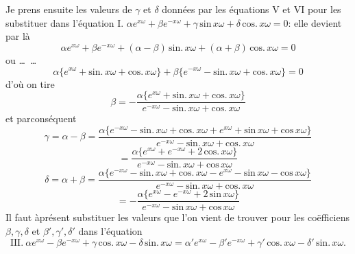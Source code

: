 \documentclass[11pt,a4paper]{article}
\begin{document}
Je prens ensuite les valeurs de $\gamma$ et $\delta$ données par les équations V et VI pour les
substituer dans l'équation I. $\alpha e^{x\omega} + \beta e^{-x\omega} + \gamma\,\text{sin}\,x\omega + \delta\,\text{cos.}\,x\omega = 0$: elle devient par là
\[ \alpha e^{x\omega} + \beta e^{-x\omega} + (\alpha - \beta)\,\text{sin.}\,x\omega + (\alpha + \beta)\,\text{cos.}\,x\omega = 0 \]
ou \ldots\ \ldots
\[ \alpha\{e^{x\omega} + \text{sin.}\,x\omega + \text{cos.}\,x\omega\} + \beta\{e^{-x\omega} - \text{sin.}\,x\omega + \text{cos.}\,x\omega\} = 0 \]
d'où on tire
\[ \beta = -\frac{\alpha\{e^{x\omega} + \text{sin.}\,x\omega + \text{cos.}\,x\omega\}}{e^{-x\omega} - \text{sin.}\,x\omega + \text{cos.}\,x\omega} \]
et parconséquent
\[ \gamma = \alpha - \beta = \frac{\alpha\{e^{-x\omega} - \text{sin.}\,x\omega + \text{cos.}\,x\omega + e^{x\omega} + \text{sin}\,x\omega + \text{cos}\,x\omega\}}{e^{-x\omega} - \text{sin.}\,x\omega + \text{cos.}\,x\omega} \]
\[ = \frac{\alpha\{e^{x\omega} + e^{-x\omega} + 2\,\text{cos.}\,x\omega\}}{e^{-x\omega} - \text{sin.}\,x\omega + \text{cos}\,x\omega} \]
\[ \delta = \alpha + \beta = \frac{\alpha\{e^{-x\omega} - \text{sin.}\,x\omega + \text{cos.}\,x\omega - e^{x\omega} - \text{sin}\,x\omega - \text{cos}\,x\omega\}}{e^{-x\omega} - \text{sin.}\,x\omega + \text{cos.}\,x\omega} \]
\[ = -\frac{\alpha\{e^{x\omega} - e^{-x\omega} + 2\,\text{sin}\,x\omega\}}{e^{-x\omega} - \text{sin}\,x\omega + \text{cos}\,x\omega} \]
Il faut àprésent substituer les valeurs que l'on vient de trouver pour les coëfficiens
$\beta, \gamma, \delta$ et $\beta', \gamma', \delta'$ dans l'équation
\[ \text{III.}\ \alpha e^{x\omega} - \beta e^{-x\omega} + \gamma\,\text{cos.}\,x\omega - \delta\,\text{sin.}\,x\omega = \alpha' e^{x\omega} - \beta' e^{-x\omega} + \gamma'\,\text{cos.}\,x\omega - \delta'\,\text{sin.}\,x\omega. \]

\end{document}
